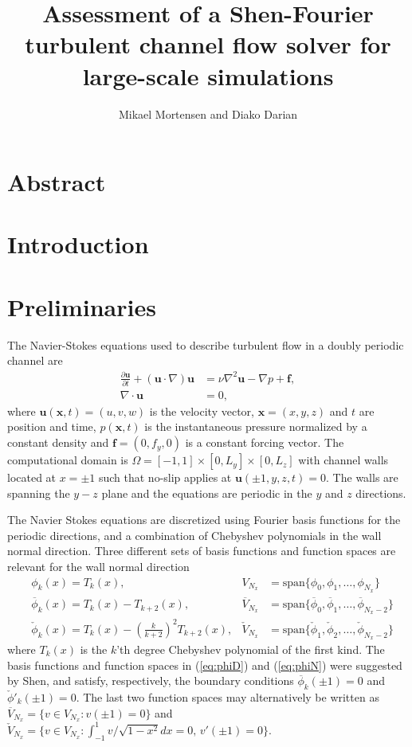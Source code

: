 \documentclass[11pt, oneside]{article}
\title{Assessment of a Shen-Fourier turbulent channel flow solver for large-scale simulations}
\author{Mikael Mortensen and Diako Darian}
\newcommand{\N}[1]{\check{#1}}
\newcommand{\D}[1]{\overline{#1}}
\begin{document}
\maketitle
\section*{Abstract}

\section{Introduction}

\section{Preliminaries}
The Navier-Stokes equations used to describe turbulent flow in a doubly periodic channel are
\begin{align}
 \frac{\partial \bm{u}}{\partial t} + (\bm{u} \cdot \nabla) \bm{u}   &= \nu \nabla^2 \bm{u} - \nabla{p} + \bm{f},  \label{eq:NS} \\
 \nabla \cdot \bm{u} &= 0,
\end{align}
where $\bm{u}(\bm{x}, t)=(u, v, w)$ is the velocity vector, $\bm{x}=(x, y, z)$ and $t$ are position and time,   $p(\bm{x}, t)$ is the instantaneous pressure normalized by a constant density and $\bm{f} = (0, f_y, 0)$ is a constant forcing vector. The computational domain is $\Omega=[-1, 1]\times [0, L_y] \times [0, L_z]$ with channel walls located at $x=\pm 1$ such that no-slip applies at $ \bm{u}(\pm 1, y, z, t) = 0$. The walls are spanning the $y-z$ plane and the equations are periodic in the $y$ and $z$ directions. 

The Navier Stokes equations are discretized using Fourier basis functions for the periodic directions, and a combination of Chebyshev polynomials in the wall normal direction. Three different sets of basis functions and function spaces are relevant for the wall normal direction
\begin{align}
&  \phi_k(x) = T_k(x), & V_{N_x} &= \text{span}\{\phi_0, \phi_1,\ldots, \phi_{N_x}\} \label{eq:Tk}\\
& \D{\phi}_k(x) = T_k(x) - T_{k+2}(x), & \D{V}_{N_x} &= \text{span} \{ \D{\phi}_0, \D{\phi}_1, \ldots, \D{\phi}_{N_x-2} \} \label{eq:phiD}\\
& \N{\phi}_k(x) = T_k(x) - \left(\frac{k}{k+2}\right)^2 T_{k+2}(x), & \N{V}_{N_x} &= \text{span} \{\N{\phi}_1, \N{\phi}_2, \ldots, \N{\phi}_{N_x-2} \} \label{eq:phiN} 
\end{align}
where $T_k(x)$ is the $k$'th degree Chebyshev polynomial of the first kind. The basis functions and function spaces in (\ref{eq:phiD}) and (\ref{eq:phiN}) were suggested by Shen, and satisfy, respectively, the boundary conditions $\D{\phi}_k(\pm 1) = 0$ and $\N{\phi}'_k(\pm 1)=0$. The last two function spaces may alternatively be written as $\D{V}_{N_x} = \{v \in V_{N_x}: v(\pm 1)=0 \}$ and $\N{V}_{N_x} = \{v \in V_{N_x}: \int_{-1}^{1}v/\sqrt{1-x^2} dx = 0, \, v'(\pm 1) = 0 \}$.  
\end{document}
